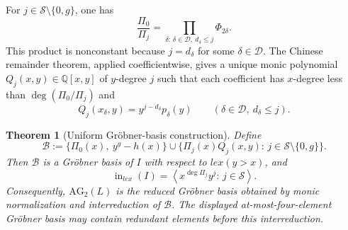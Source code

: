 \documentclass{article}
\theoremstyle{definition}
\theoremstyle{plain}
\newtheorem{theorem}[definition]{Theorem}
\newcommand{\Q}{{\mathbb{Q}}}
\newcommand{\lex}{lex}
\newcommand{\ideal}[1]{\left\langle #1 \right\rangle}
\DeclareMathOperator{\inop}{in}
\newcommand{\AG}{\mathrm{AG}}
\begin{document}
For \(j\in\mathcal S\setminus\{0,g\}\), one has
\[
\frac{\Pi_0}{\Pi_j}
=\prod_{\delta:\,\delta\in\mathcal D,\ d_\delta\le j}\Phi_{2\delta}.
\]
This product is nonconstant because \(j=d_\delta\) for some
\(\delta\in\mathcal D\).  The Chinese remainder theorem, applied
coefficientwise, gives a unique monic polynomial
\(Q_j(x,y)\in\Q[x,y]\) of
\(y\)-degree \(j\) such that each coefficient has \(x\)-degree less than
\(\deg(\Pi_0/\Pi_j)\) and
\begin{equation}\label{eq:pretzel-Qj}
Q_j(x_\delta,y)=y^{j-d_\delta}p_\delta(y)
\qquad
(\delta\in\mathcal D,\ d_\delta\le j).
\end{equation}

\begin{theorem}[Uniform Gr\"obner-basis construction]
\label{thm:pretzel-uniform}
Define
\[
\mathcal B:=
\{\Pi_0(x),\ y^g-h(x)\}
\cup
\{\Pi_j(x)Q_j(x,y):\,j\in\mathcal S\setminus\{0,g\}\}.
\]
Then \(\mathcal B\) is a Gr\"obner basis of \(I\) with respect to
\(\lex(y>x)\), and
\[
\inop_{\lex}(I)=
\ideal{x^{\deg\Pi_j}y^j:\,j\in\mathcal S}.
\]
Consequently, \(\AG_2(L)\) is the reduced Gr\"obner basis obtained
by monic normalization and interreduction of \(\mathcal B\).
The displayed at-most-four-element Gr\"obner basis may contain redundant
elements before this interreduction.
\end{theorem}
\end{document}
